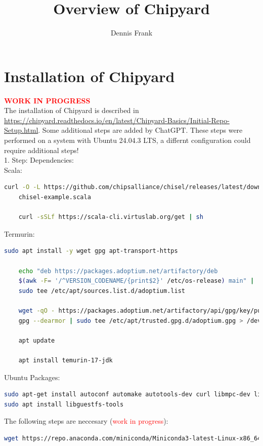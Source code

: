\documentclass{article}
\title{Overview of Chipyard}
\author{Dennis Frank}
\date{}
\begin{document}
\maketitle
 {\selectfont
\section*{Installation of Chipyard}
\textbf{\textcolor{red}{WORK IN PROGRESS}}\\
The installation of Chipyard is described in \url{https://chipyard.readthedocs.io/en/latest/Chipyard-Basics/Initial-Repo-Setup.html}. Some additional 
steps are added by ChatGPT. These steps were performed on a system with Ubuntu 24.04.3 LTS, a differnt configuration could require additional steps!\\ 
1. Step: Dependencies:\\
Scala:\\
\begin{lstlisting}[language=bash]
    curl -O -L https://github.com/chipsalliance/chisel/releases/latest/download/
    chisel-example.scala

    curl -sSLf https://scala-cli.virtuslab.org/get | sh
\end{lstlisting}
Termurin:\\
\begin{lstlisting}[language=bash]
    sudo apt install -y wget gpg apt-transport-https

    echo "deb https://packages.adoptium.net/artifactory/deb 
    $(awk -F= '/^VERSION_CODENAME/{print$2}' /etc/os-release) main" | 
    sudo tee /etc/apt/sources.list.d/adoptium.list

    wget -qO - https://packages.adoptium.net/artifactory/api/gpg/key/public | 
    gpg --dearmor | sudo tee /etc/apt/trusted.gpg.d/adoptium.gpg > /dev/null

    apt update

    apt install temurin-17-jdk
\end{lstlisting}
Ubuntu Packages:\\
\begin{lstlisting}[language=bash]
sudo apt-get install autoconf automake autotools-dev curl libmpc-dev libmpfr-dev libgmp-dev libusb-1.0-0-dev gawk build-essential bison flex texinfo gperf libtool patchutils bc zlib1g-dev device-tree-compiler pkg-config libexpat-dev libfl-dev
sudo apt install libguestfs-tools 
\end{lstlisting}

The following steps are neccesary (\textcolor{red}{work in progress}):\\
\begin{lstlisting}[language=bash]
    wget https://repo.anaconda.com/miniconda/Miniconda3-latest-Linux-x86_64.sh


\end{lstlisting}}
\end{document}
